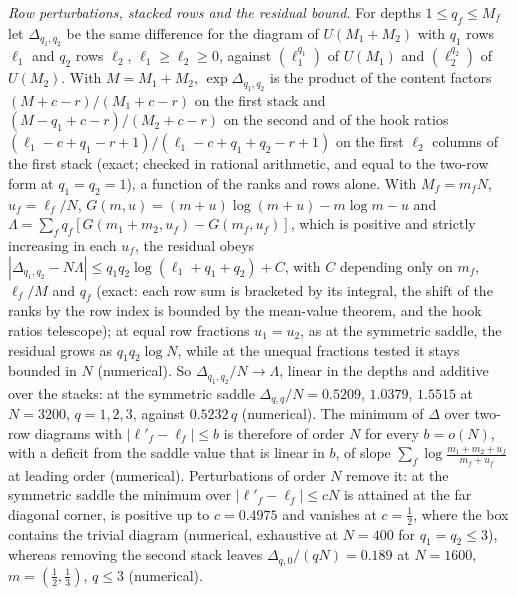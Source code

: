 \emph{Row perturbations, stacked rows and the residual bound.} For depths \(1\le q_f\le M_f\) let \(\Delta_{q_1,q_2}\) be the same difference for the diagram of \(U(M_1+M_2)\) with \(q_1\) rows \(\ell_1\) and \(q_2\) rows \(\ell_2\), \(\ell_1\ge\ell_2\ge0\), against \((\ell_1^{q_1})\) of \(U(M_1)\) and \((\ell_2^{q_2})\) of \(U(M_2)\). With \(M=M_1+M_2\), \(\exp\Delta_{q_1,q_2}\) is the product of the content factors \((M+c-r)/(M_1+c-r)\) on the first stack and \((M-q_1+c-r)/(M_2+c-r)\) on the second and of the hook ratios \((\ell_1-c+q_1-r+1)/(\ell_1-c+q_1+q_2-r+1)\) on the first \(\ell_2\) columns of the first stack (exact; checked in rational arithmetic, and equal to the two-row form at \(q_1=q_2=1\)), a function of the ranks and rows alone. With \(M_f=m_fN\), \(u_f=\ell_f/N\), \(G(m,u)=(m+u)\log(m+u)-m\log m-u\) and \(\Lambda=\sum_fq_f[G(m_1+m_2,u_f)-G(m_f,u_f)]\), which is positive and strictly increasing in each \(u_f\), the residual obeys \(|\Delta_{q_1,q_2}-N\Lambda|\le q_1q_2\log(\ell_1+q_1+q_2)+C\), with \(C\) depending only on \(m_f\), \(\ell_f/M\) and \(q_f\) (exact: each row sum is bracketed by its integral, the shift of the ranks by the row index is bounded by the mean-value theorem, and the hook ratios telescope); at equal row fractions \(u_1=u_2\), as at the symmetric saddle, the residual grows as \(q_1q_2\log N\), while at the unequal fractions tested it stays bounded in \(N\) (numerical). So \(\Delta_{q_1,q_2}/N\to\Lambda\), linear in the depths and additive over the stacks: at the symmetric saddle \(\Delta_{q,q}/N=0.5209\), \(1.0379\), \(1.5515\) at \(N=3200\), \(q=1,2,3\), against \(0.5232\,q\) (numerical). The minimum of \(\Delta\) over two-row diagrams with \(|\ell'_f-\ell_f|\le b\) is therefore of order \(N\) for every \(b=o(N)\), with a deficit from the saddle value that is linear in \(b\), of slope \(\sum_f\log\frac{m_1+m_2+u_f}{m_f+u_f}\) at leading order (numerical). Perturbations of order \(N\) remove it: at the symmetric saddle the minimum over \(|\ell'_f-\ell_f|\le cN\) is attained at the far diagonal corner, is positive up to \(c=0.4975\) and vanishes at \(c=\tfrac12\), where the box contains the trivial diagram (numerical, exhaustive at \(N=400\) for \(q_1=q_2\le3\)), whereas removing the second stack leaves \(\Delta_{q,0}/(qN)=0.189\) at \(N=1600\), \(m=(\tfrac12,\tfrac13)\), \(q\le3\) (numerical).

